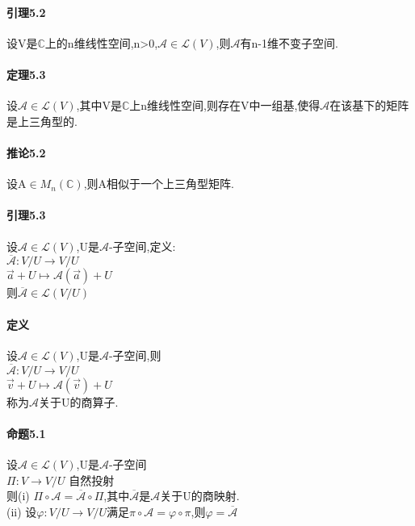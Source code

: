 \documentclass{ctexart}
\begin{document}
\paragraph{引理5.2}
设V是$\mathbb{C}$上的n维线性空间,n>0,$\mathcal{A}\in\mathcal{L}(V)$,则$\mathcal{A}$有n-1维不变子空间.
\paragraph{定理5.3}
设$\mathcal{A}\in\mathcal{L}(V)$,其中V是$\mathbb{C}$上n维线性空间,则存在V中一组基,使得$\mathcal{A}$在该基下的矩阵是上三角型的.
\paragraph{推论5.2}
设A$\in M_{n}(\mathbb{C})$,则A相似于一个上三角型矩阵.
\paragraph{引理5.3}
设$\mathcal{A}\in\mathcal{L}(V)$,U是$\mathcal{A}$-子空间,定义: \\
$\overline{\mathcal{A}}:V/U \to V/U$\\
$\vec{a}+U\mapsto\mathcal{A}(\vec{a})+U$\\
则$\overline{\mathcal{A}}\in\mathcal{L}(V/U)$
\paragraph{定义}
设$\mathcal{A}\in\mathcal{L}(V)$,U是$\mathcal{A}$-子空间,则\\
$\overline{\mathcal{A}}:V/U \to V/U$\\
$\vec{v}+U\mapsto\mathcal{A}(\vec{v})+U$\\
称为$\mathcal{A}$关于U的商算子.
\paragraph{命题5.1}
设$\mathcal{A}\in\mathcal{L}(V)$,U是$\mathcal{A}$-子空间\\
$\Pi : V \to V/U$ 自然投射\\
则(i)  $\Pi \circ \mathcal{A} = \overline{\mathcal{A}} \circ \Pi$,其中$\overline{\mathcal{A}}$是$\mathcal{A}$关于U的商映射.\\
(ii) 设$\varphi : V/U \to V/U$满足$\pi \circ \mathcal{A} = \varphi \circ \pi$,则$\varphi = \overline{\mathcal{A}}$
\end{document}
